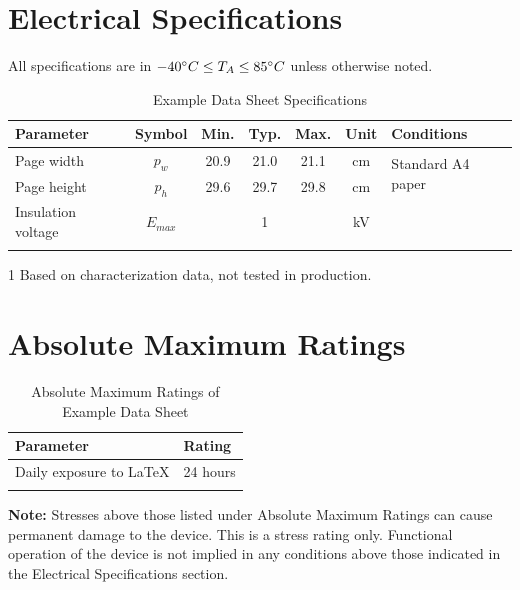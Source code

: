 \documentclass[10pt]{datasheet}
\begin{document}
\onecolumn

\section{Electrical Specifications}
All specifications are in $-40\degree C \leq T_A \leq 85\degree C$ unless otherwise noted.

\begin{table}[h]
\begin{threeparttable}
\caption{Example Data Sheet Specifications}
\begin{tabularx}{\textwidth}{l | c | c c c | c | X}
    \thickhline
    \textbf{Parameter} & \textbf{Symbol} & \textbf{Min.} & \textbf{Typ.} & \textbf{Max.} &
    \textbf{Unit} & \textbf{Conditions} \\
    \hline
    Page width  & $p_w$ & 20.9 & 21.0 & 21.1 & cm & \multirow{2}{*}{Standard A4 paper} \\
    Page height & $p_h$ & 29.6 & 29.7 & 29.8 & cm &  \\
    \hline
    Insulation voltage & $E_{max}$\tnote{1} & & 1 & & kV & \\
    \thickhline
\end{tabularx}
\begin{tablenotes}
\item[1]{Based on characterization data, not tested in production.}
\end{tablenotes}
\end{threeparttable}
\end{table}

\section{Absolute Maximum Ratings}

\begin{table}[h]
\caption{Absolute Maximum Ratings of Example Data Sheet}
\begin{tabularx}{\textwidth}{l | X}
    \thickhline
    \textbf{Parameter} & \textbf{Rating} \hspace{5cm} \\
    \hline
    Daily exposure to LaTeX & 24 hours \\
    \thickhline
\end{tabularx}
\end{table}

\textbf{Note:} Stresses above those listed under Absolute Maximum Ratings can
cause permanent damage to the device. This is a stress rating only. Functional
operation of the device is not implied in any conditions above those indicated
in the Electrical Specifications section.
\end{document}
